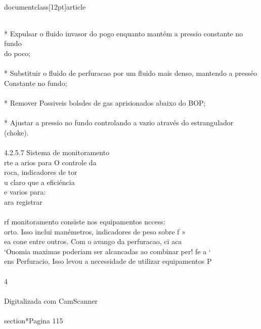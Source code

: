 \\documentclass[12pt]{article}
\begin{document}
\\
* Expulsar o fluido invasor do pogo enquanto mantém a pressio constante no fundo\\
do poco;\\
\\
* Substituir o fluido de perfuracao por um fluido mais denso, mantendo a presséo\\
Constante no fundo;\\
\\
* Remover Possiveis bolsdes de gas aprisionados abaixo do BOP;\\
\\
* Ajustar a pressio no fundo controlando a vazio através do estrangulador (choke).\\
\\
4.2.5.7 Sistema de monitoramento\\
rte a arios para O controle da\\
roca, indicadores de tor\\
u claro que a eficiéncia\\
e varios para:\\
ara registrar\\
\\
rf monitoramento consiste nos equipamentos nccess:\\
orto. Isso inclui manémetros, indicadores de peso sobre f »\\
ea cone entre outros. Com o avango da perfuracao, ci aca\\
‘Onomia maximas poderiam ser alcancadas ao combinar per! fe a ‘\\
ens Perfuracio, Isso levou a necessidade de utilizar equipamentos P\\
\\
4\\
\\
Digitalizada com CamScanner\\

\\section*{Pagina 115}
\end{document}
